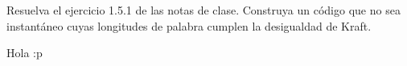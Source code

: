 
Resuelva el ejercicio 1.5.1 de las notas de clase.
Construya un código que no sea instantáneo cuyas longitudes  de palabra cumplen la desigualdad de Kraft.
\begin{sol}
    Hola :p
\end{sol}